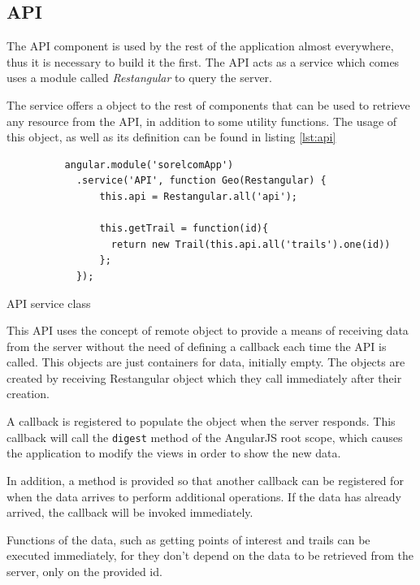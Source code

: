 \subsection{API}

The API component is used by the rest of the application almost everywhere, thus it is necessary to build it the first. The API acts as a service which comes uses a module called \textit{Restangular} to query the server.

The service offers a object to the rest of components that can be used to retrieve any resource from the API, in addition to some utility functions. The usage of this object, as well as its definition can be found in listing \ref{lst:api}

\begin{listing}[ht]\centering
  \begin{minipage}{.85\textwidth}
    \begin{verbatim}
          angular.module('sorelcomApp')
            .service('API', function Geo(Restangular) {
            	this.api = Restangular.all('api');
            	
            	this.getTrail = function(id){
            	  return new Trail(this.api.all('trails').one(id))
            	};
            });
    \end{verbatim}
  \end{minipage}
  \caption{API service class}\label{lst:api}
\end{listing}

This API uses the concept of remote object to provide a means of receiving data from the server without the need of defining a callback each time the API is called. This objects are just containers for data, initially empty. The objects are created by receiving Restangular object which they call immediately after their creation.

A callback is registered to populate the object when the server responds. This callback will call the \texttt{digest} method of the AngularJS root scope, which causes the application to modify the views in order to show the new data.

In addition, a method is provided so that another callback can be registered for when the data arrives to perform additional operations. If the data has already arrived, the callback will be invoked immediately.

Functions of the data, such as getting points of interest and trails can be executed immediately, for they don't depend on the data to be retrieved from the server, only on the provided id.

